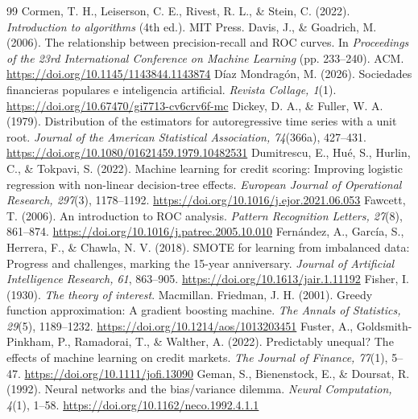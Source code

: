 \begin{thebibliography}{99}
 Cormen, T. H., Leiserson, C. E., Rivest, R. L., \& Stein, C. (2022). \textit{Introduction to algorithms} (4th ed.). MIT Press.%
 Davis, J., \& Goadrich, M. (2006). The relationship between precision-recall and ROC curves. In \textit{Proceedings of the 23rd International Conference on Machine Learning} (pp. 233--240). ACM. \url{https://doi.org/10.1145/1143844.1143874}
 Díaz Mondragón, M. (2026). Sociedades financieras populares e inteligencia artificial. \textit{Revista Collage, 1}(1). \url{https://doi.org/10.67470/gi7713-cv6crv6f-mc}%
 Dickey, D. A., \& Fuller, W. A. (1979). Distribution of the estimators for autoregressive time series with a unit root. \textit{Journal of the American Statistical Association, 74}(366a), 427--431. \url{https://doi.org/10.1080/01621459.1979.10482531}
 Dumitrescu, E., Hué, S., Hurlin, C., \& Tokpavi, S. (2022). Machine learning for credit scoring: Improving logistic regression with non-linear decision-tree effects. \textit{European Journal of Operational Research, 297}(3), 1178--1192. \url{https://doi.org/10.1016/j.ejor.2021.06.053}
 Fawcett, T. (2006). An introduction to ROC analysis. \textit{Pattern Recognition Letters, 27}(8), 861--874. \url{https://doi.org/10.1016/j.patrec.2005.10.010}
 Fernández, A., García, S., Herrera, F., \& Chawla, N. V. (2018). SMOTE for learning from imbalanced data: Progress and challenges, marking the 15-year anniversary. \textit{Journal of Artificial Intelligence Research, 61}, 863--905. \url{https://doi.org/10.1613/jair.1.11192}
 Fisher, I. (1930). \textit{The theory of interest}. Macmillan.%
 Friedman, J. H. (2001). Greedy function approximation: A gradient boosting machine. \textit{The Annals of Statistics, 29}(5), 1189--1232. \url{https://doi.org/10.1214/aos/1013203451}
 Fuster, A., Goldsmith-Pinkham, P., Ramadorai, T., \& Walther, A. (2022). Predictably unequal? The effects of machine learning on credit markets. \textit{The Journal of Finance, 77}(1), 5--47. \url{https://doi.org/10.1111/jofi.13090}
 Geman, S., Bienenstock, E., \& Doursat, R. (1992). Neural networks and the bias/variance dilemma. \textit{Neural Computation, 4}(1), 1--58. \url{https://doi.org/10.1162/neco.1992.4.1.1}

\end{thebibliography}

